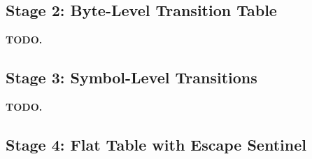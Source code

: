 \documentclass[sigconf,nonacm]{acmart}
\begin{document}
\subsection{Stage 2: Byte-Level Transition Table}
\label{sec:stage2}


\textbf{TODO.}


\subsection{Stage 3: Symbol-Level Transitions}
\label{sec:stage3}

%
%
%

\textbf{TODO.}


\subsection{Stage 4: Flat Table with Escape Sentinel}
\label{sec:stage4}

%
%
\end{document}
